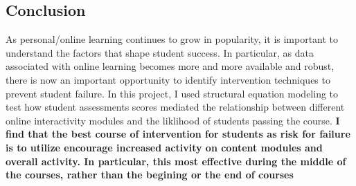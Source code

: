 \documentclass[]{article}
\begin{document}
\subsection{Conclusion}\label{conclusion}

As personal/online learning continues to grow in popularity, it is
important to understand the factors that shape student success. In
particular, as data associated with online learning becomes more and
more available and robust, there is now an important opportunity to
identify intervention techniques to prevent student failure. In this
project, I used structural equation modeling to test how student
assessments scores mediated the relationship between different online
interactivity modules and the liklihood of students passing the course.
\textbf{I find that the best course of intervention for students as risk
for failure is to utilize encourage increased activity on content
modules and overall activity. In particular, this most effective during
the middle of the courses, rather than the begining or the end of
courses}
\end{document}
